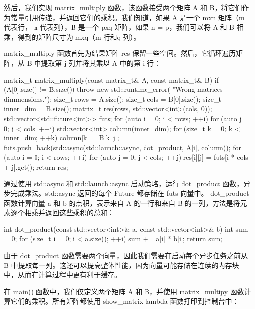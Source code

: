然后，我们实现 matrix\_multiply 函数，该函数接受两个矩阵 A 和 B，将它们作为常量引用传递，并返回它们的乘积。我们知道，如果 A 是一个 mxn 矩阵（m 代表行， n 代表列），B 是一个 pxq 矩阵，如果 n = p，我们可以将 A 和 B 相乘，得到的矩阵尺寸为 mxq（m 行和q 列）。

matrix\_multiply 函数首先为结果矩阵 res 保留一些空间。然后，它循环遍历矩阵，从 B 中提取第 j 列并将其乘以 A 中的第 i 行：

\begin{cpp}
matrix_t matrix_multiply(const matrix_t& A,
                         const matrix_t& B) {
    if (A[0].size() != B.size()) {
        throw new std::runtime_error(
                  "Wrong matrices dimmensions.");
    }
    size_t rows = A.size();
    size_t cols = B[0].size();
    size_t inner_dim = B.size();
    matrix_t res(rows, std::vector<int>(cols, 0));
    std::vector<std::future<int>> futs;
    for (auto i = 0; i < rows; ++i) {
        for (auto j = 0; j < cols; ++j) {
            std::vector<int> column(inner_dim);
            for (size_t k = 0; k < inner_dim; ++k) {
                column[k] = B[k][j];
            }
            futs.push_back(std::async(std::launch::async,
                                      dot_product,
                                      A[i], column));
        }
    }
    for (auto i = 0; i < rows; ++i) {
        for (auto j = 0; j < cols; ++j) {
            res[i][j] = futs[i * cols + j].get();
        }
    }
    return res;
}
\end{cpp}

通过使用 std::async 和 std::launch::async 启动策略，运行 dot\_product 函数，异步完成乘法。std::async 返回的每个 Future 都存储在 futs 向量中。 dot\_product 函数计算向量 a 和 b 的点积，表示来自 A 的一行和来自 B 的一列，方法是将元素逐个相乘并返回这些乘积的总和：

\begin{cpp}
int dot_product(const std::vector<int>& a,
                const std::vector<int>& b) {
    int sum = 0;
    for (size_t i = 0; i < a.size(); ++i) {
        sum += a[i] * b[i];
    }
    return sum;
}
\end{cpp}

由于 dot\_product 函数需要两个向量，因此我们需要在启动每个异步任务之前从 B 中提取每一列。这还可以提高整体性能，因为向量可能存储在连续的内存块中，从而在计算过程中更有利于缓存。

在 main() 函数中，我们仅定义两个矩阵 A 和 B，并使用 matrix\_multipy 函数计算它们的乘积。所有矩阵都使用 show\_matrix lambda 函数打印到控制台中：

